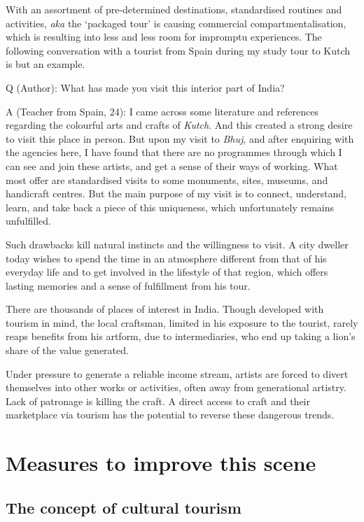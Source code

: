 With an assortment of pre-determined destinations, standardised routines and activities, \emph{aka} the `packaged tour' is causing commercial compartmentalisation, which is resulting into less and less room for impromptu experiences. The following conversation with a tourist from Spain during my study tour to Kutch is but an example.

Q (Author): What has made you visit this interior part of India?

A (Teacher from Spain, 24): I came across some literature and references regarding the colourful arts and crafts of \emph{Kutch}. And this created a strong desire to visit this place in person. But upon my visit to \emph{Bhuj}, and after enquiring with the agencies here, I have found that there are no programmes through which I can see and join these artists, and get a sense of their ways of working. What most offer are standardised visits to some monuments, sites, museums, and handicraft centres. But the main purpose of my visit is to connect, understand, learn, and take back a piece of this uniqueness, which unfortunately remains unfulfilled.

Such drawbacks kill natural instincts and the willingness to visit. A city dweller today wishes to spend the time in an atmosphere different from that of his everyday life and to get involved in the lifestyle of that region, which offers lasting memories and a sense of fulfillment from his tour.

There are thousands of places of interest in India. Though developed with tourism in mind, the local craftsman, limited in his exposure to the tourist, rarely reaps benefits from his artform, due to intermediaries, who end up taking a lion's share of the value generated.

Under pressure to generate a reliable income stream, artists are forced to divert themselves into other works or activities, often away from generational artistry. Lack of patronage is killing the craft. A direct access to craft and their marketplace via tourism has the potential to reverse these dangerous trends.


\section{Measures to improve this scene} %
\label{sec:measures}

\subsection{The concept of cultural tourism} %
\label{sub:concept_ct}

